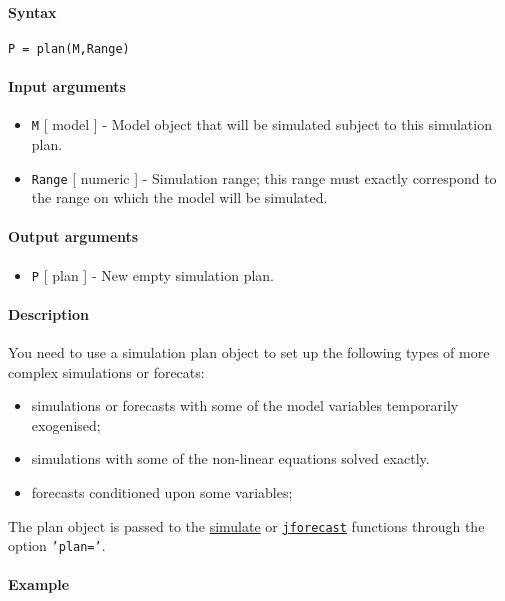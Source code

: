 


	\paragraph{Syntax}\label{syntax}

\begin{verbatim}
P = plan(M,Range)
\end{verbatim}

\paragraph{Input arguments}\label{input-arguments}

\begin{itemize}
\item
  \texttt{M} {[} model {]} - Model object that will be simulated subject
  to this simulation plan.
\item
  \texttt{Range} {[} numeric {]} - Simulation range; this range must
  exactly correspond to the range on which the model will be simulated.
\end{itemize}

\paragraph{Output arguments}\label{output-arguments}

\begin{itemize}
\itemsep1pt\parskip0pt
\item
  \texttt{P} {[} plan {]} - New empty simulation plan.
\end{itemize}

\paragraph{Description}\label{description}

You need to use a simulation plan object to set up the following types
of more complex simulations or forecats:

\begin{itemize}
\item
  simulations or forecasts with some of the model variables temporarily
  exogenised;
\item
  simulations with some of the non-linear equations solved exactly.
\item
  forecasts conditioned upon some variables;
\end{itemize}

The plan object is passed to the \href{model/simulate}{simulate} or
\href{model/jforecast}{\texttt{jforecast}} functions through the option
\texttt{'plan='}.

\paragraph{Example}\label{example}


